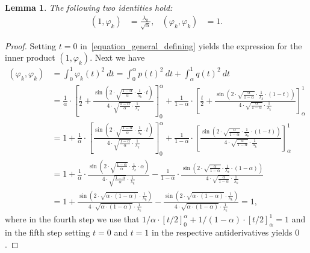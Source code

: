 \documentclass[11pt,reqno]{amsart}
\newtheorem{lemma}{Lemma}[section]
\theoremstyle{definition}
\numberwithin{equation}{section}
\newcommand{\bl}[2]{(#1,#2)}
\begin{document}
\begin{lemma}
The following two identities hold:
\begin{align*}
\bl{1}{\varphi_{k}}
& = 
\frac{\lambda_{k}}{\sqrt{\alpha}} , &
\bl{\varphi_{k}}{\varphi_{k}}
& = 
1.
\end{align*}
\label{lemma_unit_length}
\end{lemma}
\begin{proof}
Setting $t=0$ in~\eqref{equation_general_defining}
yields the expression for the inner product $\bl{1}{\varphi_{k}}$.
Next we have
\begin{align*}
\bl{\varphi_{k}}{\varphi_{k}}
& =
\int_{0}^{1} \varphi_{k}(t)^{2} \: dt 
=
\int_{0}^{\alpha} p(t)^{2} \: dt 
+
\int_{\alpha}^{1} q(t)^{2} \: dt 
\\
& =
\frac{1}{\alpha} \cdot
\left[
\frac{t}{2}
+
\frac{\sin\left(
2 \cdot \sqrt{\frac{1-\alpha}{\alpha}} \cdot \frac{1}{\lambda_{k}} \cdot t
\right)}
{4 \cdot \sqrt{\frac{1-\alpha}{\alpha}} \cdot \frac{1}{\lambda_{k}}}
\right]_{0}^{\alpha}
+
\frac{1}{1-\alpha} \cdot
\left[
\frac{t}{2}
+
\frac{\sin\left(
2 \cdot \sqrt{\frac{\alpha}{1-\alpha}} \cdot \frac{1}{\lambda_{k}} \cdot (1-t)
\right)}
{4 \cdot \sqrt{\frac{\alpha}{1-\alpha}} \cdot \frac{1}{\lambda_{k}}}
\right]_{\alpha}^{1} 
\\
& =
1 +
\frac{1}{\alpha} \cdot
\left[
\frac{\sin\left(
2 \cdot \sqrt{\frac{1-\alpha}{\alpha}} \cdot \frac{1}{\lambda_{k}} \cdot t
\right)}
{4 \cdot \sqrt{\frac{1-\alpha}{\alpha}} \cdot \frac{1}{\lambda_{k}}}
\right]_{0}^{\alpha}
+
\frac{1}{1-\alpha} \cdot
\left[
\frac{\sin\left(
2 \cdot \sqrt{\frac{\alpha}{1-\alpha}} \cdot \frac{1}{\lambda_{k}} \cdot (1-t)
\right)}
{4 \cdot \sqrt{\frac{\alpha}{1-\alpha}} \cdot \frac{1}{\lambda_{k}}}
\right]_{\alpha}^{1} 
\\
& =
1 +
\frac{1}{\alpha} \cdot
\frac{\sin\left(
2 \cdot \sqrt{\frac{1-\alpha}{\alpha}} \cdot \frac{1}{\lambda_{k}} \cdot \alpha
\right)}
{4 \cdot \sqrt{\frac{1-\alpha}{\alpha}} \cdot \frac{1}{\lambda_{k}}}
-
\frac{1}{1-\alpha} \cdot
\frac{\sin\left(
2 \cdot \sqrt{\frac{\alpha}{1-\alpha}} \cdot \frac{1}{\lambda_{k}} \cdot (1-\alpha)
\right)}
{4 \cdot \sqrt{\frac{\alpha}{1-\alpha}} \cdot \frac{1}{\lambda_{k}}}
\\
& =
1 +
\frac{\sin\left(
2 \cdot \sqrt{\alpha \cdot (1-\alpha)} \cdot \frac{1}{\lambda_{k}}
\right)}
{4 \cdot \sqrt{\alpha \cdot (1-\alpha)} \cdot \frac{1}{\lambda_{k}}}
-
\frac{\sin\left(
2 \cdot \sqrt{\alpha \cdot (1-\alpha)} \cdot \frac{1}{\lambda_{k}}
\right)}
{4 \cdot \sqrt{\alpha \cdot (1-\alpha)} \cdot \frac{1}{\lambda_{k}}} 
= 1,
\end{align*}
where in the fourth step we use that
$1/\alpha \cdot \left[ t/2 \right]_{0}^{\alpha}
+
1/(1-\alpha) \cdot \left[ t/2 \right]_{\alpha}^{1} = 1$
and in the fifth step setting $t=0$ and $t=1$ in the respective antiderivatives yields $0$.
\end{proof}
\end{document}
